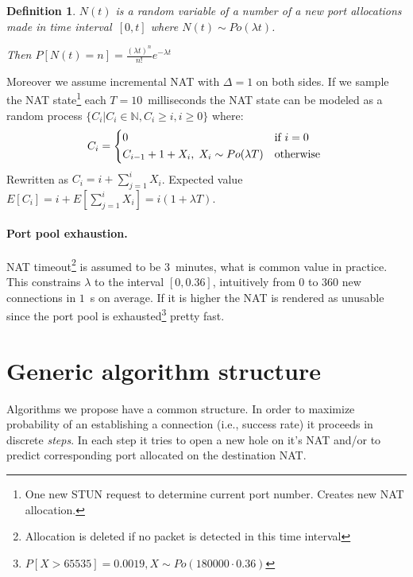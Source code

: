 \documentclass[twoside]{article}
\newtheorem{mydef}{Definition}
\begin{document}
\begin{multicols}{2}
\begin{mydef}
$N(t)$ is a random variable of a number of a new port allocations made in time 
interval~$[0,t]$ where $N(t) \sim Po(\lambda t)$. \\ 
                                                      
\begin{center}                                                     
Then $P[N(t)=n] = \frac{(\lambda t)^n}{n!} e^{-\lambda t}$
\end{center}
\end{mydef}

Moreover we assume incremental NAT with $\Delta=1$ on both sides. If we sample the NAT 
state\footnote{One new STUN request to determine current port number. Creates new NAT allocation.}
each $T=10$~milliseconds the NAT state can be modeled as a random process $\{C_i | C_i \in \mathbb{N}, C_i \geq i, i\geq0\}$ where:
\[
C_i = \begin{dcases*}
         0 & if $i=0$ \\
         C_{i-1} + 1 + X_i, \; X_i \sim Po(\lambda T) & otherwise 
        \end{dcases*}
\]
Rewritten as $C_i = i + \sum_{j=1}^{i}X_i$. Expected value $E[C_i] = i + E[\sum_{j=1}^{i}X_i] = i (1+\lambda T)$.

\paragraph{Port pool exhaustion.} NAT timeout\footnote{Allocation is deleted if no packet is detected in this time interval} is assumed to be 3~minutes, 
what is common value in practice. This constrains $\lambda$ to the interval $[0, 0.36]$, intuitively from $0$ to $360$ new connections in $1$~s on average. 
If it is higher the NAT is rendered as unusable since the port pool is exhausted\footnote{$P[X > 65535] = 0.0019, X \sim Po(180000 \cdot 0.36)$} pretty fast.

\section{Generic algorithm structure}
Algorithms we propose have a common structure. In order to maximize probability of an establishing
a connection (i.e., success rate) it proceeds in discrete \emph{steps}. In each step it 
tries to open a new hole on it's NAT and/or to predict corresponding port allocated on the destination
NAT.


\end{multicols}
\end{document}
